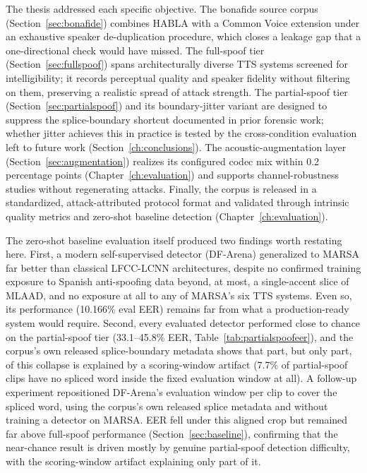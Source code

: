\documentclass[11pt]{report}
\begin{document}
The thesis addressed each specific objective. The
bonafide source corpus (Section~\ref{sec:bonafide}) combines HABLA with a
Common Voice extension under an exhaustive speaker de-duplication
procedure, which closes a leakage gap that a one-directional check would
have missed. The full-spoof tier (Section~\ref{sec:fullspoof}) spans
architecturally diverse TTS systems screened for intelligibility; it
records perceptual quality and speaker fidelity without filtering on
them, preserving a realistic spread of attack strength. The partial-spoof
tier (Section~\ref{sec:partialspoof}) and its boundary-jitter variant
are designed to suppress the splice-boundary shortcut documented in
prior forensic work; whether jitter achieves this in practice is tested
by the cross-condition evaluation left to future work
(Section~\ref{ch:conclusions}).
The acoustic-augmentation layer (Section~\ref{sec:augmentation}) realizes
its configured codec mix within 0.2 percentage points
(Chapter~\ref{ch:evaluation}) and supports channel-robustness studies
without regenerating attacks. Finally, the corpus is released in a
standardized, attack-attributed protocol format and validated through
intrinsic quality metrics and zero-shot baseline detection
(Chapter~\ref{ch:evaluation}).

The zero-shot baseline evaluation itself produced two findings worth
restating here. First, a modern self-supervised detector (DF-Arena)
generalized to MARSA far better than classical LFCC-LCNN architectures,
despite no confirmed training exposure to Spanish anti-spoofing data
beyond, at most, a single-accent slice of MLAAD, and no exposure at all
to any of MARSA's six TTS systems. Even so, its performance (10.166\%
eval EER) remains far from what a production-ready system would
require. Second, every evaluated detector performed close to chance on
the partial-spoof tier (33.1--45.8\% EER, Table~\ref{tab:partialspoofeer}), and the corpus's own released
splice-boundary metadata shows that part, but only part, of this
collapse is explained by a scoring-window artifact (7.7\% of
partial-spoof clips have no spliced word inside the fixed evaluation
window at all). A follow-up experiment repositioned DF-Arena's
evaluation window per clip to cover the spliced word, using the
corpus's own released splice metadata and without training a detector
on MARSA. EER fell under this aligned crop but remained far above
full-spoof performance (Section~\ref{sec:baseline}), confirming that
the near-chance result is driven mostly by genuine partial-spoof
detection difficulty, with the scoring-window artifact explaining only
part of it.
\end{document}
